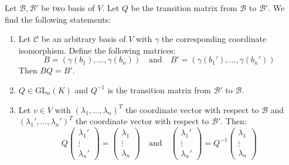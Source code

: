         \begin{theorem}\label{linalgebra:theorem:transition_matrix}
		Let $\mathcal{B}, \mathcal{B}'$ be two basis of $V$. Let $Q$ be the transition matrix from $\mathcal{B}$ to $\mathcal{B}'$. We find the following statements:
	        \begin{enumerate}
			\item Let $\mathcal{C}$ be an arbitrary basis of $V$ with $\gamma$ the corresponding coordinate isomorphism. Define the following matrices:
        	        	\[
        	        		B=(\gamma(b_1), ..., \gamma(b_n))\quad\text{and}\quad B'=(\gamma(b_1'), ..., \gamma(b_n'))
        	        	\]
		                Then $BQ = B'$.
			\item $Q\in\text{GL}_n(K)$ and $Q^{-1}$ is the transition matrix from $\mathcal{B}'$ to $\mathcal{B}$.
                	\item Let $v\in V$ with $(\lambda_1, ..., \lambda_n)^T$ the coordinate vector with respect to $\mathcal{B}$ and $(\lambda_1', ..., \lambda_n')^T$ the coordinate vector with respect to $\mathcal{B}'$. Then:
                	\[
		                Q\left(
				\begin{array}{c}
					\lambda_1'\\
                			\vdots\\
			        	\lambda_n'
				\end{array}
                        	\right)
                        	=
		                \left(
                		\begin{array}{c}
					\lambda_1\\
                			\vdots\\
			        	\lambda_n
				\end{array}
                        	\right)
				\quad\text{and}\quad
                        	\left(
                        	\begin{array}{c}
					\lambda_1'\\
                        		\vdots\\
			        	\lambda_n'
				\end{array}
		                \right)
                	        =
                	        Q^{-1}\left(
                	        \begin{array}{c}
					\lambda_1\\
                		        \vdots\\
			                \lambda_n
				\end{array}
                        	\right)
			\]
		\end{enumerate}
	\end{theorem}
        
